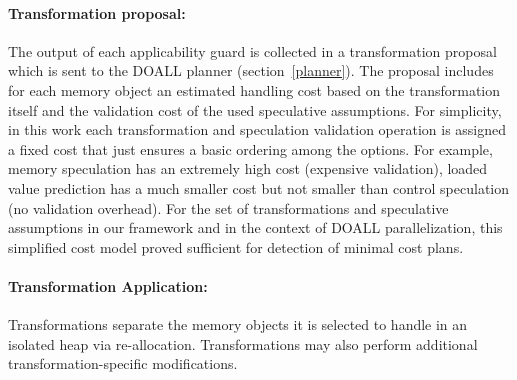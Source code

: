 \paragraph{Transformation proposal:} The output of each applicability
guard is collected in a transformation proposal which is sent to the
DOALL planner (section~\ref{planner}).
%
The proposal includes for each memory object an estimated handling
cost based on the transformation itself and the validation cost of the
used speculative assumptions.
%
%
For simplicity, in this work each transformation and speculation
validation operation is assigned a fixed
cost that just ensures a basic ordering among the options. For
example,
memory speculation has an extremely high cost (expensive validation),
loaded value prediction has a much smaller cost but not smaller than
control speculation (no validation overhead).
%
%
For the set of transformations and speculative assumptions in our
framework and in the context of DOALL parallelization, this simplified
cost model proved sufficient for detection of minimal cost plans.
%

%
%
%
%
%

\paragraph{Transformation Application:} Transformations separate the
memory objects it is selected to handle
in an isolated heap via re-allocation.  Transformations may also
perform additional transformation-specific modifications.

